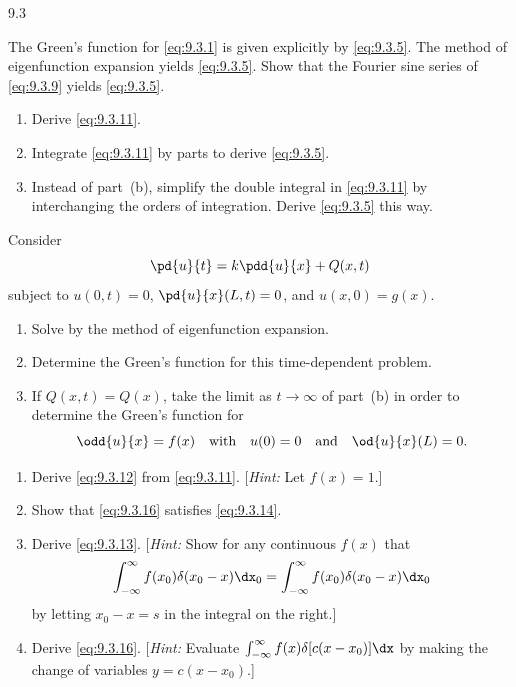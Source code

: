 \begin{exercises}{9.3}

\item The Green's function for \eqref{eq:9.3.1} is given explicitly by \eqref{eq:9.3.5}.  The method of eigenfunction expansion yields \eqref{eq:9.3.5}.  Show that the Fourier sine series of \eqref{eq:9.3.9} yields \eqref{eq:9.3.5}.

\item
\begin{enumerate}
\item[(a)] Derive \eqref{eq:9.3.11}.
\item[(b)] Integrate \eqref{eq:9.3.11} by parts to derive \eqref{eq:9.3.5}.
\item[(c)] Instead of part~(b), simplify the double integral in \eqref{eq:9.3.11} by interchanging the orders of integration.  Derive \eqref{eq:9.3.5} this way.
\end{enumerate}

\item Consider
\[
\pd{u}{t} = k\pdd{u}{x} + Q(x,t)
\]
subject to $u(0,t)=0$, $\pd{u}{x}(L,t)=0$, and $u(x,0)=g(x)$.
\begin{enumerate}
\item[(a)] Solve by the method of eigenfunction expansion.
\item[(b)] Determine the Green's function for this time-dependent problem.
\item[(c)] If $Q(x,t) = Q(x)$, take the limit as $t \to \infty$ of part~(b) in order to determine the Green's function for
\[
\odd{u}{x} = f(x) \quad\text{with}\quad u(0)=0 \quad\text{and}\quad \od{u}{x}(L) = 0.
\]
\end{enumerate}

\item
\begin{enumerate}
\item[(a)] Derive \eqref{eq:9.3.12} from \eqref{eq:9.3.11}.  [\textit{Hint:} Let $f(x)=1$.]
\item[(b)] Show that \eqref{eq:9.3.16} satisfies \eqref{eq:9.3.14}.
\item[(c)] Derive \eqref{eq:9.3.13}.  [\textit{Hint:} Show for any continuous $f(x)$ that
\[
\int_{-\infty}^{\infty} f(x_0)\delta(x_0 - x)\dx_0 = \int_{-\infty}^{\infty} f(x_0)\delta(x_0 - x)\dx_0
\]
by letting $x_0 - x = s$ in the integral on the right.]
\item[(d)] Derive \eqref{eq:9.3.16}.  [\textit{Hint:} Evaluate $\int_{-\infty}^{\infty} f(x)\delta[c(x-x_0)]\dx$ by making the change of variables $y = c(x-x_0)$.]
\end{enumerate}


\end{exercises}
